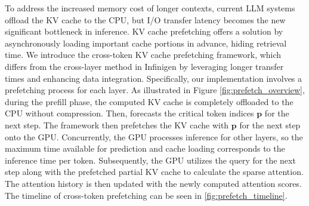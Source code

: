 To address the increased memory cost of longer contexts, current LLM systems offload the KV cache to the CPU, but I/O transfer latency becomes the new significant bottleneck in inference. KV cache prefetching offers a solution by asynchronously loading important cache portions in advance, hiding retrieval time. We introduce the cross-token KV cache prefetching framework, which differs from the cross-layer method in Infinigen \citep{lee2024infinigen} by leveraging longer transfer times and enhancing data integration. 
Specifically, our implementation involves a prefetching process for each layer. As illustrated in Figure \ref{fig:prefetch_overview}, during the prefill phase, the computed KV cache is completely offloaded to the CPU without compression. Then, \ours forecasts the critical token indices $\mathbf{p}$ for the next step. The framework then prefetches the KV cache with $\mathbf{p}$ for the next step onto the GPU. Concurrently, the GPU processes inference for other layers, so the maximum time available for prediction and cache loading corresponds to the inference time per token. Subsequently, the GPU utilizes the query for the next step along with the prefetched partial KV cache to calculate the sparse attention. The attention history is then updated with the newly computed attention scores. The timeline of cross-token prefetching can be seen in \autoref{fig:prefetch_timeline}.


